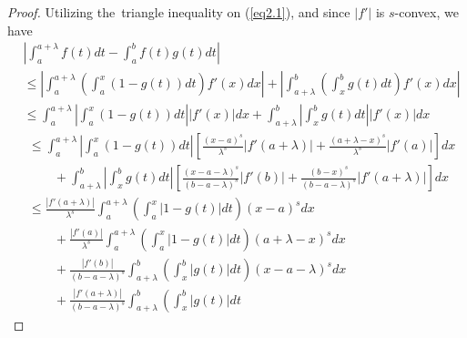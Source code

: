 \documentclass{amsart}
\theoremstyle{plain}
\numberwithin{equation}{section}
\begin{document}
\begin{proof}
Utilizing the\ triangle inequality on (\ref{eq2.1}), and since
$|f'|$ is $s$-convex, we have
\begin{align*}
&\left| {\int_a^{a + \lambda } {f\left( t \right)dt}  - \int_a^b
{f\left( t \right)g\left( t \right)dt} } \right|
\\
&\le \left| {\int_a^{a + \lambda } {\left( {\int_a^x {\left( {1 -
g\left( t \right)} \right)dt} } \right)f'\left( x \right)dx} }
\right|+ \left| {\int_{a + \lambda }^b {\left( {\int_x^b {g\left(
t \right)dt} } \right)f'\left( x \right)dx} } \right|
\\
&\le \int_a^{a + \lambda } { \left| {\int_a^x {\left( {1 - g\left(
t \right)} \right)dt} } \right|\left| {f'\left( x \right)}
\right|dx} + \int_{a + \lambda }^b {\left| {\int_x^b {g\left( t
\right)dt} } \right| \left| {f'\left( x \right)} \right| dx}
\end{align*}
\begin{align*}
&\le \int_a^{a + \lambda } { \left| {\int_a^x {\left( {1 - g\left(
t \right)} \right)dt} } \right|\left[ {\frac{\left( {x -
a}\right)^s}{\lambda^s} \left| {f'\left( {a+\lambda} \right)}
\right| + \frac{\left( {a+ \lambda - x}\right)^s}{\lambda^s}
\left| {f'\left( a \right)} \right|} \right]dx}
\\
&\qquad+ \int_{a + \lambda }^b {\left| {\int_x^b {g\left( t
\right)dt} } \right| \left[ {\frac{\left( {x - a -
\lambda}\right)^s}{\left( {b - a - \lambda} \right)^s} \left|
{f'\left( b \right)} \right| + \frac{\left( {b -
x}\right)^s}{\left( {b - a - \lambda} \right)^s} \left| {f'\left(
a +\lambda \right)} \right|} \right] dx}
\\
&\le  \frac{{\left| {f'\left( a+\lambda \right)}
\right|}}{{\lambda^s}} \int_a^{a + \lambda } { \left( {\int_a^x
{\left| {1 - g\left( t \right)} \right|dt}} \right) \left( {x - a}
\right)^s dx}
\\
&\qquad+\frac{{\left| {f'\left( a \right)} \right|}}{{\lambda^s}}
\int_a^{a + \lambda } { \left( {\int_a^x {\left| {1 - g\left( t
\right)} \right|dt}} \right) \left( {a + \lambda - x} \right)^s
dx}
\\
&\qquad+ \frac{{\left| {f'\left( b \right)} \right|}}{{\left( {b -
a - \lambda} \right)^s}} \int_{a + \lambda }^b {\left( {\int_x^b
{\left| {g\left( t \right)} \right|dt} } \right) \left( {x - a
-\lambda} \right)^s dx}
\\
&\qquad+ \frac{{\left| {f'\left( a + \lambda \right)}
\right|}}{{\left( {b - a - \lambda} \right)^s}} \int_{a + \lambda
}^b {\left( {\int_x^b {\left| {g\left( t \right)} \right|dt} }
}
\end{align*}
\end{proof}
\end{document}
